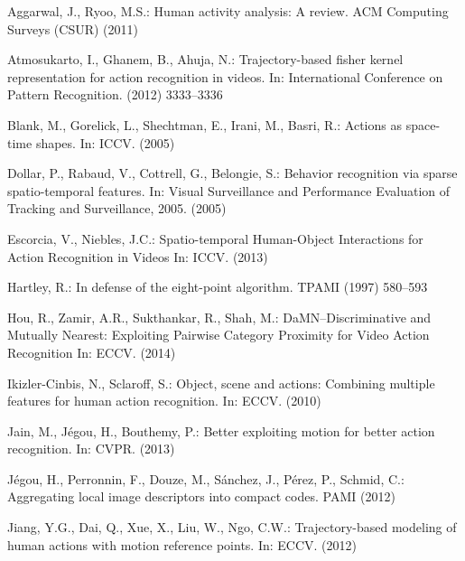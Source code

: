 \documentclass[runningheads]{llncs}
\begin{document}


\begin{thebibliography}{10}

Aggarwal, J., Ryoo, M.S.:
\newblock Human activity analysis: A review.
\newblock ACM Computing Surveys (CSUR) (2011)

Atmosukarto, I., Ghanem, B., Ahuja, N.:
\newblock Trajectory-based fisher kernel representation for action recognition
  in videos.
\newblock In: International Conference on Pattern Recognition. (2012)
  3333--3336

Blank, M., Gorelick, L., Shechtman, E., Irani, M., Basri, R.:
\newblock Actions as space-time shapes.
\newblock In: ICCV. (2005)

Dollar, P., Rabaud, V., Cottrell, G., Belongie, S.:
\newblock Behavior recognition via sparse spatio-temporal features.
\newblock In: Visual Surveillance and Performance Evaluation of Tracking and
  Surveillance, 2005. (2005)

Escorcia, V., Niebles, J.C.:
\newblock Spatio-temporal Human-Object Interactions for Action Recognition in Videos
\newblock In: ICCV.
\newblock (2013)

Hartley, R.:
\newblock In defense of the eight-point algorithm.
\newblock TPAMI (1997)  580--593

Hou, R., Zamir, A.R., Sukthankar, R., Shah, M.:
\newblock DaMN--Discriminative and Mutually Nearest: Exploiting Pairwise Category Proximity for Video Action Recognition
\newblock In: ECCV.
\newblock (2014)

Ikizler-Cinbis, N., Sclaroff, S.:
\newblock Object, scene and actions: Combining multiple features for human
  action recognition.
\newblock In: ECCV.
\newblock (2010)

Jain, M., J{\'e}gou, H., Bouthemy, P.:
\newblock Better exploiting motion for better action recognition.
\newblock In: CVPR. (2013)

J{\'e}gou, H., Perronnin, F., Douze, M., S{\'a}nchez, J., P{\'e}rez, P.,
  Schmid, C.:
\newblock Aggregating local image descriptors into compact codes.
\newblock PAMI (2012)

Jiang, Y.G., Dai, Q., Xue, X., Liu, W., Ngo, C.W.:
\newblock Trajectory-based modeling of human actions with motion reference points.
\newblock In: ECCV.
\newblock (2012)


\end{thebibliography}
\end{document}
